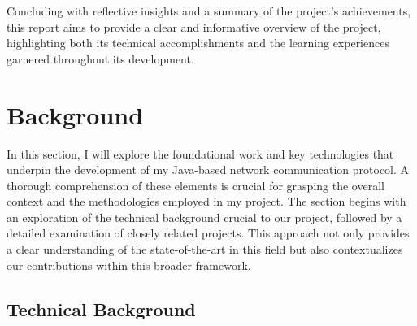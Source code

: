 \documentclass{article}
\begin{document}
Concluding with reflective insights and a summary of the project’s achievements, this report aims to provide a clear and informative overview of the project, highlighting both its technical accomplishments and the learning experiences garnered throughout its development.


\section{Background}
\label{sec:background}

In this section, I will explore the foundational work and key technologies that underpin the development of my Java-based network communication protocol. A thorough comprehension of these elements is crucial for grasping the overall context and the methodologies employed in my project. The section begins with an exploration of the technical background crucial to our project, followed by a detailed examination of closely related projects. This approach not only provides a clear understanding of the state-of-the-art in this field but also contextualizes our contributions within this broader framework.

\subsection{Technical Background}
\end{document}

